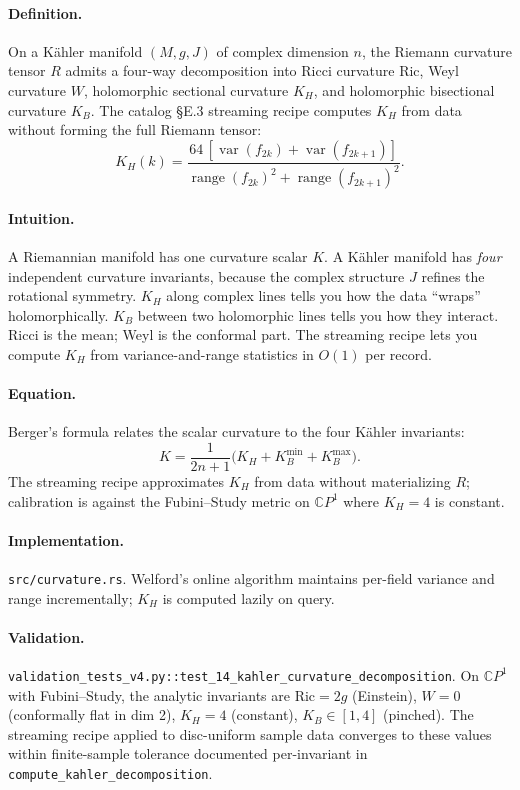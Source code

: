 \documentclass[11pt,letterpaper]{article}
\begin{document}
\paragraph{Definition.}
On a K\"ahler manifold $(M, g, J)$ of complex dimension $n$, the
Riemann curvature tensor $R$ admits a four-way decomposition into
Ricci curvature $\text{Ric}$, Weyl curvature $W$, holomorphic
sectional curvature $K_H$, and holomorphic bisectional curvature
$K_B$. The catalog \S E.3 streaming recipe computes $K_H$ from data
without forming the full Riemann tensor:
\[
K_H(k) = \frac{64 \, [\operatorname{var}(f_{2k}) +
\operatorname{var}(f_{2k+1})]}
{\operatorname{range}(f_{2k})^2
+ \operatorname{range}(f_{2k+1})^2}.
\]

\paragraph{Intuition.}
A Riemannian manifold has one curvature scalar $K$. A K\"ahler
manifold has \emph{four} independent curvature invariants, because
the complex structure $J$ refines the rotational symmetry. $K_H$
along complex lines tells you how the data ``wraps''
holomorphically. $K_B$ between two holomorphic lines tells you how
they interact. Ricci is the mean; Weyl is the conformal part. The
streaming recipe lets you compute $K_H$ from variance-and-range
statistics in $O(1)$ per record.

\paragraph{Equation.}
Berger's formula relates the scalar curvature to the four
K\"ahler invariants:
\[
K = \frac{1}{2n+1} \bigl( K_H + K_B^{\min} + K_B^{\max} \bigr).
\]
The streaming recipe approximates $K_H$ from data without
materializing $R$; calibration is against the Fubini--Study metric
on $\mathbb{C}P^1$ where $K_H = 4$ is constant.

\paragraph{Implementation.}
\texttt{src/curvature.rs}. Welford's online
algorithm maintains per-field variance and range incrementally;
$K_H$ is computed lazily on query.

\paragraph{Validation.}
\texttt{validation\_tests\_v4.py::test\_14\_kahler\_curvature\_decomposition}.
On $\mathbb{C}P^1$ with Fubini--Study, the analytic invariants are
$\text{Ric} = 2g$ (Einstein), $W = 0$ (conformally flat in dim 2),
$K_H = 4$ (constant), $K_B \in [1, 4]$ (pinched). The streaming
recipe applied to disc-uniform sample data converges to these
values within finite-sample tolerance documented per-invariant in
\texttt{compute\_kahler\_decomposition}.
\end{document}
